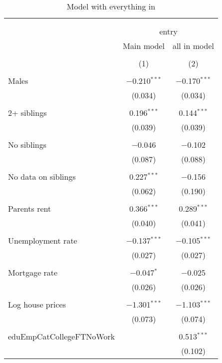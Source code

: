 
\begin{table}[!htbp] \centering 
  \caption{Model with everything in} 
  \label{employed} 
\begin{tabular}{@{\extracolsep{1pt}}lcc} 
\\[-1.8ex]\hline 
\hline \\[-1.8ex] 
\\[-1.8ex] & \multicolumn{2}{c}{entry} \\ 
 & Main model & all in model \\ 
\\[-1.8ex] & (1) & (2)\\ 
\hline \\[-1.8ex] 
 Males & $-$0.210$^{***}$ & $-$0.170$^{***}$ \\ 
  & (0.034) & (0.034) \\ 
  & & \\ 
 2+ siblings & 0.196$^{***}$ & 0.144$^{***}$ \\ 
  & (0.039) & (0.039) \\ 
  & & \\ 
 No siblings & $-$0.046 & $-$0.102 \\ 
  & (0.087) & (0.088) \\ 
  & & \\ 
 No data on siblings & 0.227$^{***}$ & $-$0.156 \\ 
  & (0.062) & (0.190) \\ 
  & & \\ 
 Parents rent & 0.366$^{***}$ & 0.289$^{***}$ \\ 
  & (0.040) & (0.041) \\ 
  & & \\ 
 Unemployment rate & $-$0.137$^{***}$ & $-$0.105$^{***}$ \\ 
  & (0.027) & (0.027) \\ 
  & & \\ 
 Mortgage rate & $-$0.047$^{*}$ & $-$0.025 \\ 
  & (0.026) & (0.026) \\ 
  & & \\ 
 Log house prices & $-$1.301$^{***}$ & $-$1.103$^{***}$ \\ 
  & (0.073) & (0.074) \\ 
  & & \\ 
 eduEmpCatCollegeFTNoWork &  & 0.513$^{***}$ \\ 
  &  & (0.102) \\ 

\end{tabular}
\end{table}
